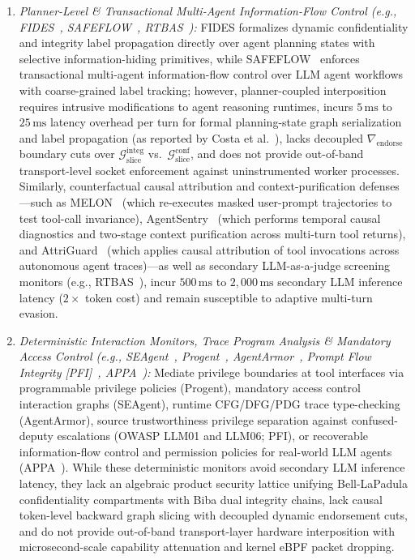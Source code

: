 \documentclass[conference,10pt]{IEEEtran}
\begin{document}
\begin{itemize}
\begin{enumerate}
        \item \textit{Planner-Level \& Transactional Multi-Agent Information-Flow Control (e.g., FIDES~\cite{costa2025fides}, SAFEFLOW~\cite{li2025safeflow}, RTBAS~\cite{zhong2025rtbas}):} FIDES formalizes dynamic confidentiality and integrity label propagation directly over agent planning states with selective information-hiding primitives, while SAFEFLOW~\cite{li2025safeflow} enforces transactional multi-agent information-flow control over LLM agent workflows with coarse-grained label tracking; however, planner-coupled interposition requires intrusive modifications to agent reasoning runtimes, incurs $5\,\text{ms}$ to $25\,\text{ms}$ latency overhead per turn for formal planning-state graph serialization and label propagation (as reported by Costa et al.~\cite{costa2025fides}), lacks decoupled $\nabla_{\text{endorse}}$ boundary cuts over $\mathcal{G}_{\text{slice}}^{\text{integ}}$ vs.\ $\mathcal{G}_{\text{slice}}^{\text{conf}}$, and does not provide out-of-band transport-level socket enforcement against uninstrumented worker processes. Similarly, counterfactual causal attribution and context-purification defenses---such as MELON~\cite{zhu2025melon} (which re-executes masked user-prompt trajectories to test tool-call invariance), AgentSentry~\cite{zhang2026agentsentry} (which performs temporal causal diagnostics and two-stage context purification across multi-turn tool returns), and AttriGuard~\cite{he2026attriguard} (which applies causal attribution of tool invocations across autonomous agent traces)---as well as secondary LLM-as-a-judge screening monitors (e.g., RTBAS~\cite{zhong2025rtbas}), incur $500\,\text{ms}$ to $2{,}000\,\text{ms}$ secondary LLM inference latency ($2\times$ token cost) and remain susceptible to adaptive multi-turn evasion.
        \item \textit{Deterministic Interaction Monitors, Trace Program Analysis \& Mandatory Access Control (e.g., SEAgent~\cite{ji2026seagent}, Progent~\cite{shi2025progent}, AgentArmor~\cite{wang2025agentarmor}, Prompt Flow Integrity [PFI]~\cite{kim2025pfi}, APPA~\cite{kravchenko2026appa}):} Mediate privilege boundaries at tool interfaces via programmable privilege policies (Progent), mandatory access control interaction graphs (SEAgent), runtime CFG/DFG/PDG trace type-checking (AgentArmor), source trustworthiness privilege separation against confused-deputy escalations (OWASP LLM01 and LLM06; PFI), or recoverable information-flow control and permission policies for real-world LLM agents (APPA~\cite{kravchenko2026appa}). While these deterministic monitors avoid secondary LLM inference latency, they lack an algebraic product security lattice unifying Bell-LaPadula confidentiality compartments with Biba dual integrity chains, lack causal token-level backward graph slicing with decoupled dynamic endorsement cuts, and do not provide out-of-band transport-layer hardware interposition with microsecond-scale capability attenuation and kernel eBPF packet dropping.

\end{enumerate}
\end{itemize}
\end{document}
